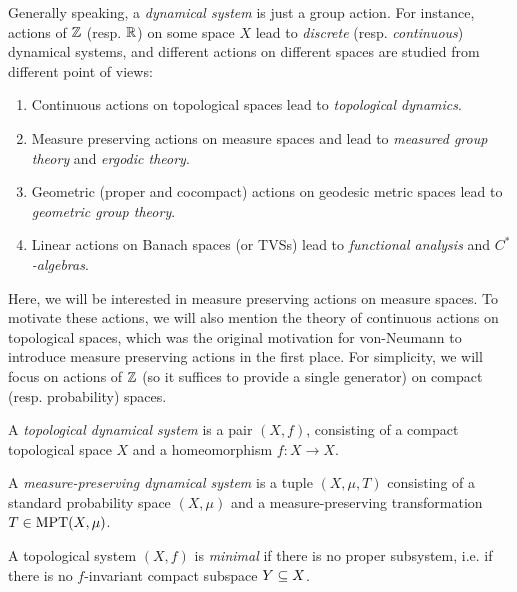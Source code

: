 \documentclass[reqno, twoside]{article}
\begin{document}
    Generally speaking, a \textit{dynamical system} is just a group action. For instance, actions of $\mathbb{Z}$ (resp. $\mathbb{R}$) on some space $X$ lead to \textit{discrete} (resp. \textit{continuous}) dynamical systems, and different actions on different spaces are studied from different point of views:
    \begin{enumerate}
        \item Continuous actions on topological spaces lead to \textit{topological dynamics}.
            \vspace{-0.05in}
        \item Measure preserving actions on measure spaces and lead to \textit{measured group theory} and \textit{ergodic theory}.
            \vspace{-0.05in}
        \item Geometric (proper and cocompact) actions on geodesic metric spaces lead to \textit{geometric group theory}.
            \vspace{-0.05in}
        \item Linear actions on Banach spaces (or TVSs) lead to \textit{functional analysis} and \textit{$C^\ast$-algebras}.
    \end{enumerate}

    Here, we will be interested in measure preserving actions on measure spaces. To motivate these actions, we will also mention the theory of continuous actions on topological spaces, which was the original motivation for von-Neumann to introduce measure preserving actions in the first place. For simplicity, we will focus on actions of $\mathbb{Z}$ (so it suffices to provide a single generator) on compact (resp. probability) spaces.

    \begin{definition}
        A \textit{topological dynamical system} is a pair $(X,f)$, consisting of a compact topological space $X$ and a homeomorphism $f:X\to X$.
    \end{definition}

    \begin{definition}
        A \textit{measure-preserving dynamical system} is a tuple $(X,\mu,T)$ consisting of a standard probability space $(X,\mu)$ and a measure-preserving transformation $T\in\operatorname{MPT}(X,\mu)$.
    \end{definition}

    \begin{definition}
        A topological system $(X,f)$ is \textit{minimal} if there is no proper subsystem, i.e. if there is no $f$-invariant compact subspace $Y\subseteq X$.
    \end{definition}
\end{document}

